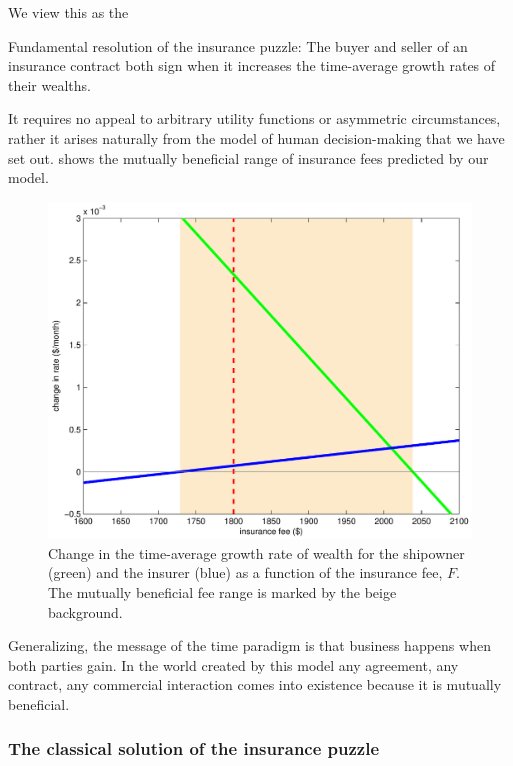 We view this as the
\begin{keypts}{Fundamental resolution of the insurance puzzle:}
The buyer and seller of an insurance contract both sign when it increases the time-average growth rates of their wealths.
\end{keypts}
It requires no appeal to arbitrary utility functions or asymmetric circumstances, rather it arises naturally from the model of human decision-making that we have set out.  shows the mutually beneficial range of insurance fees predicted by our model.
\begin{figure}
\centering
\includegraphics[width=\textwidth]{./chapter_decisions/figs/ins_log_cropped.pdf}
\caption{Change in the time-average growth rate of wealth for the shipowner (green) and the insurer (blue) as a function of the insurance fee, $F$. The mutually beneficial fee range is marked by the beige background.}
\end{figure}
Generalizing, the message of the time paradigm is that business happens when both parties gain.
In the world created by this model any agreement, any contract, any commercial interaction 
comes into existence because it is mutually beneficial.

\subsubsection{The classical solution of the insurance puzzle}

